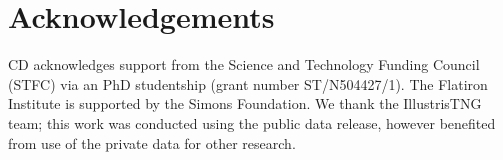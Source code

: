 \documentclass[fleqn,usenatbib]{mnras}
\begin{document}

\section*{Acknowledgements}
CD acknowledges support from the Science and Technology Funding Council (STFC) via an PhD studentship (grant number ST/N504427/1). The Flatiron Institute is supported by the Simons Foundation. We thank the IllustrisTNG team; this work was conducted using the public data release, however benefited from use of the private data for other research. 

\vspace{-1em}
\label{lastpage}

 


\end{document}
